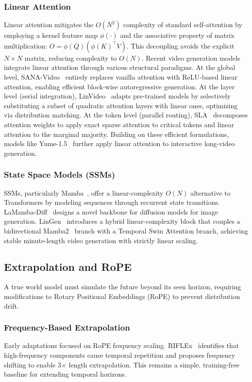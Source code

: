 \documentclass[lettersize,journal]{IEEEtran}
\begin{document}
\subsubsection{Linear Attention}
Linear attention mitigates the $O(N^2)$ complexity of standard self-attention by employing a kernel feature map $\phi(\cdot)$ and the associative property of matrix multiplication: $O = \phi(Q) (\phi(K)^\top V)$. This decoupling avoids the explicit $N \times N$ matrix, reducing complexity to $O(N)$. Recent video generation models integrate linear attention through various structural paradigms. At the global level, {SANA-Video}~\cite{chen2026sanavideo} entirely replaces vanilla attention with ReLU-based linear attention, enabling efficient block-wise autoregressive generation. At the layer level (serial integration), {LinVideo}~\cite{huang2025linvideo} adapts pre-trained models by selectively substituting a subset of quadratic attention layers with linear ones, optimizing via distribution matching. At the token level (parallel routing), {SLA}~\cite{zhang2025sla} decomposes attention weights to apply exact sparse attention to critical tokens and linear attention to the marginal majority. Building on these efficient formulations, models like {Yume-1.5}~\cite{mao2025yume} further apply linear attention to interactive long-video generation.

\subsubsection{State Space Models (SSMs)}
SSMs, particularly Mamba~\cite{gu2024mamba}, offer a linear-complexity $O(N)$ alternative to Transformers by modeling sequences through recurrent state transitions. LaMamba-Diff~\cite{Fu_2025_BMVC} designs a novel backbone for diffusion models for image generation.
LinGen~\cite{Wang_2025_CVPR} introduces a hybrid linear-complexity block that couples a bidirectional Mamba2~\cite{dao2024transformers} branch with a Temporal Swin Attention branch, achieving stable minute-length video generation with strictly linear scaling.




\subsection{Extrapolation and RoPE}
A true world model must simulate the future beyond its seen horizon, requiring modifications to Rotary Positional Embeddings (RoPE) to prevent distribution drift.
\subsubsection{Frequency-Based Extrapolation}
Early adaptations focused on RoPE frequency scaling. RIFLEx~\cite{zhao2025riflex} identifies that high-frequency components cause temporal repetition and proposes frequency shifting to enable 3$\times$ length extrapolation. This remains a simple, training-free baseline for extending temporal horizons.
\end{document}
